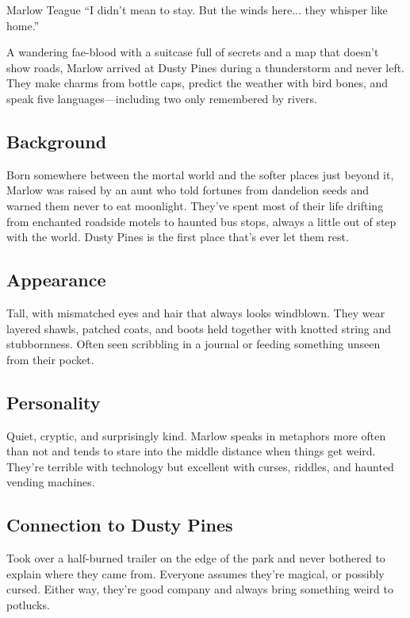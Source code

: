 \newpage
\begin{WyrdCharacterSheet}
    {Marlow Teague}
    {“I didn’t mean to stay. But the winds here... they whisper like home.”}
    \label{pc:marlow-teague}

    A wandering fae-blood with a suitcase full of secrets and a map that doesn’t show roads, Marlow arrived at Dusty Pines during a thunderstorm and never left. They make charms from bottle caps, predict the weather with bird bones, and speak five languages—including two only remembered by rivers.

    \subsection{Background}
    Born somewhere between the mortal world and the softer places just beyond it, Marlow was raised by an aunt who told fortunes from dandelion seeds and warned them never to eat moonlight. They’ve spent most of their life drifting from enchanted roadside motels to haunted bus stops, always a little out of step with the world. Dusty Pines is the first place that’s ever let them rest.

    \subsection{Appearance}
    Tall, with mismatched eyes and hair that always looks windblown. They wear layered shawls, patched coats, and boots held together with knotted string and stubbornness. Often seen scribbling in a journal or feeding something unseen from their pocket.

    \subsection{Personality}
    Quiet, cryptic, and surprisingly kind. Marlow speaks in metaphors more often than not and tends to stare into the middle distance when things get weird. They’re terrible with technology but excellent with curses, riddles, and haunted vending machines.

    \subsection{Connection to Dusty Pines}
    Took over a half-burned trailer on the edge of the park and never bothered to explain where they came from. Everyone assumes they’re magical, or possibly cursed. Either way, they’re good company and always bring something weird to potlucks.


\end{WyrdCharacterSheet}
